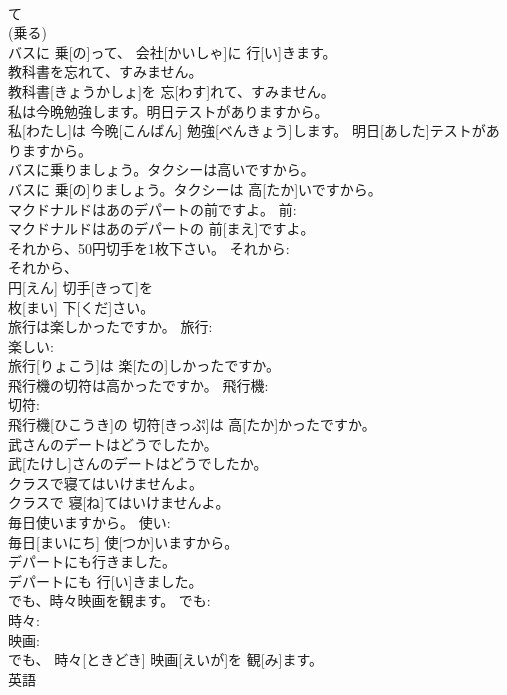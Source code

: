 \documentclass[8pt]{extreport}
\begin{document}
\begin{CJK}{UTF8}{min}
\\	て 
\\	(乗る) 
\\	バスに 乗[の]って、 会社[かいしゃ]に 行[い]きます。		
\\	教科書を忘れて、すみません。	
\\	教科書[きょうかしょ]を 忘[わす]れて、すみません。	
\\	私は今晩勉強します。明日テストがありますから。	
\\	私[わたし]は 今晩[こんばん] 勉強[べんきょう]します。 明日[あした]テストがありますから。	
\\	バスに乗りましょう。タクシーは高いですから。	
\\	バスに 乗[の]りましょう。タクシーは 高[たか]いですから。	
\\	マクドナルドはあのデパートの前ですよ。	前: 
\\	マクドナルドはあのデパートの 前[まえ]ですよ。	
\\	それから、50円切手を1枚下さい。	それから: 
\\	それから、 
\\	円[えん] 切手[きって]を 
\\	枚[まい] 下[くだ]さい。		
\\	旅行は楽しかったですか。	旅行: 
\\	楽しい: 
\\	旅行[りょこう]は 楽[たの]しかったですか。		
\\	飛行機の切符は高かったですか。	飛行機: 
\\	切符: 
\\	飛行機[ひこうき]の 切符[きっぷ]は 高[たか]かったですか。		
\\	武さんのデートはどうでしたか。	
\\	武[たけし]さんのデートはどうでしたか。	
\\	クラスで寝てはいけませんよ。	
\\	クラスで 寝[ね]てはいけませんよ。	
\\	毎日使いますから。	使い: 
\\	毎日[まいにち] 使[つか]いますから。		
\\	デパートにも行きました。	
\\	デパートにも 行[い]きました。	
\\	でも、時々映画を観ます。	でも: 
\\	時々: 
\\	映画: 
\\	でも、 時々[ときどき] 映画[えいが]を 観[み]ます。		
\\	英語	

\end{CJK}
\end{document}
